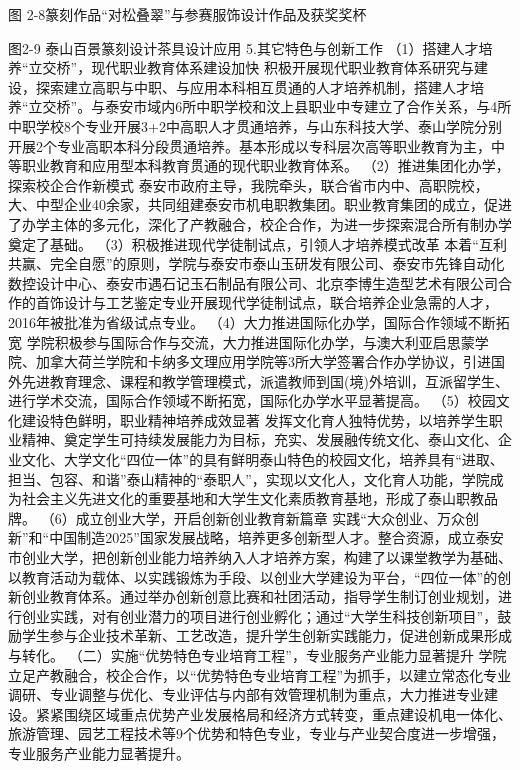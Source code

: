 图 2-8篆刻作品“对松叠翠”与参赛服饰设计作品及获奖奖杯

图2-9  泰山百景篆刻设计茶具设计应用
5.其它特色与创新工作
（1）搭建人才培养“立交桥”，现代职业教育体系建设加快
积极开展现代职业教育体系研究与建设，探索建立高职与中职、与应用本科相互贯通的人才培养机制，搭建人才培养“立交桥”。与泰安市域内6所中职学校和汶上县职业中专建立了合作关系，与4所中职学校8个专业开展3+2中高职人才贯通培养，与山东科技大学、泰山学院分别开展2个专业高职本科分段贯通培养。基本形成以专科层次高等职业教育为主，中等职业教育和应用型本科教育贯通的现代职业教育体系。     
（2）推进集团化办学，探索校企合作新模式
泰安市政府主导，我院牵头，联合省市内中、高职院校，大、中型企业40余家，共同组建泰安市机电职教集团。职业教育集团的成立，促进了办学主体的多元化，深化了产教融合，校企合作，为进一步探索混合所有制办学奠定了基础。
（3）积极推进现代学徒制试点，引领人才培养模式改革
本着“互利共赢、完全自愿”的原则，学院与泰安市泰山玉研发有限公司、泰安市先锋自动化数控设计中心、泰安市遇石记玉石制品有限公司、北京李博生造型艺术有限公司合作的首饰设计与工艺鉴定专业开展现代学徒制试点，联合培养企业急需的人才，2016年被批准为省级试点专业。
（4）大力推进国际化办学，国际合作领域不断拓宽
学院积极参与国际合作与交流，大力推进国际化办学，与澳大利亚启思蒙学院、加拿大荷兰学院和卡纳多文理应用学院等3所大学签署合作办学协议，引进国外先进教育理念、课程和教学管理模式，派遣教师到国(境)外培训，互派留学生、进行学术交流，国际合作领域不断拓宽，国际化办学水平显著提高。
（5）校园文化建设特色鲜明，职业精神培养成效显著
发挥文化育人独特优势，以培养学生职业精神、奠定学生可持续发展能力为目标，充实、发展融传统文化、泰山文化、企业文化、大学文化“四位一体”的具有鲜明泰山特色的校园文化，培养具有“进取、担当、包容、和谐”泰山精神的“泰职人”，实现以文化人，文化育人功能，学院成为社会主义先进文化的重要基地和大学生文化素质教育基地，形成了泰山职教品牌。
（6）成立创业大学，开启创新创业教育新篇章
实践“大众创业、万众创新”和“中国制造2025”国家发展战略，培养更多创新型人才。整合资源，成立泰安市创业大学，把创新创业能力培养纳入人才培养方案，构建了以课堂教学为基础、以教育活动为载体、以实践锻炼为手段、以创业大学建设为平台，“四位一体”的创新创业教育体系。通过举办创新创意比赛和社团活动，指导学生制订创业规划，进行创业实践，对有创业潜力的项目进行创业孵化；通过“大学生科技创新项目”，鼓励学生参与企业技术革新、工艺改造，提升学生创新实践能力，促进创新成果形成与转化。
（二）实施“优势特色专业培育工程”，专业服务产业能力显著提升
学院立足产教融合，校企合作，以“优势特色专业培育工程”为抓手，以建立常态化专业调研、专业调整与优化、专业评估与内部有效管理机制为重点，大力推进专业建设。紧紧围绕区域重点优势产业发展格局和经济方式转变，重点建设机电一体化、旅游管理、园艺工程技术等9个优势和特色专业，专业与产业契合度进一步增强，专业服务产业能力显著提升。
